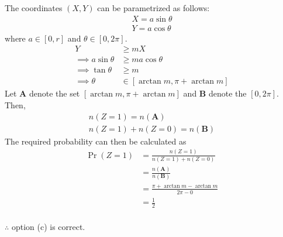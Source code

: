 \documentclass[journal,12pt,twocolumn]{IEEEtran}
\providecommand{\pr}[1]{\ensuremath{\Pr\left(#1\right)}}
\theoremstyle{remark}
\numberwithin{equation}{subsection}
\begin{document}
The coordinates $(X,Y)$ can be parametrized as follows:
\begin{align}
    X = a\sin\theta\\
    Y = a\cos\theta
\end{align} 
where $a \in [0,r]$ and $\theta \in [0, 2\pi]$. 
\begin{align}
    Y &\geq mX\\
    \implies a\sin\theta &\geq ma\cos\theta\\
    \implies \tan\theta &\geq m\\
    \implies \theta &\in [\arctan m, \pi+\arctan m]
\end{align}
Let \textbf{A} denote the set $[\arctan m, \pi + \arctan m]$ and \textbf{B} denote the $[0,2\pi]$. Then,
\begin{align}
    n(Z=1) = n(\textbf{A})\\
    n(Z=1)+n(Z=0) = n(\textbf{B})
\end{align}
The required probability can then be calculated as
\begin{align}
    \pr{Z=1} &= \frac{n(Z=1)}{n(Z=1)+n(Z=0)}\\
    &=\frac{n(\textbf{A})}{n(\textbf{B})}\\
    &=\frac{\pi+\arctan m - \arctan m}{2\pi-0}\\
    &=\frac{1}{2}
\end{align}
\\ $\therefore$ option (c) is correct.
\end{document}
